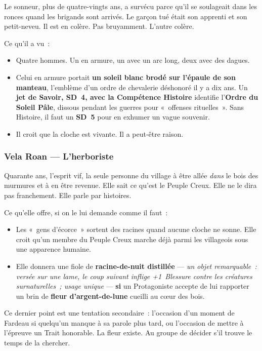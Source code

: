\documentclass[10pt,a4paper]{article}
\newcommand{\tightlist}{\setlength{\itemsep}{0pt}\setlength{\parskip}{0pt}}
\begin{document}
Le sonneur, plus de quatre-vingts ans, a survécu parce qu’il se soulageait dans les ronces quand les brigands sont arrivés. Le garçon tué était son apprenti et son petit-neveu. Il est en colère. Pas bruyamment. L’autre colère.

Ce qu’il a vu~:

\begin{itemize}
\tightlist
\item
  Quatre hommes. Un en armure, un avec un arc long, deux avec des dagues.
\item
  Celui en armure portait \textbf{un soleil blanc brodé sur l’épaule de son manteau}, l’emblème d’un ordre de chevalerie déshonoré il y a dix ans. Un \textbf{jet de Savoir, SD~4, avec la Compétence Histoire} identifie l’\textbf{Ordre du Soleil Pâle}, dissous pendant les guerres pour «~offenses rituelles~». Sans Histoire, il faut un \textbf{SD~5} pour en exhumer un vague souvenir.
\item
  Il croit que la cloche est vivante. Il a peut-être raison.
\end{itemize}

\subsubsection{Vela Roan --- L’herboriste}\label{vela-roan-lherboriste}

Quarante ans, l’esprit vif, la seule personne du village à être allée \emph{dans} le bois des murmures et à en être revenue. Elle sait ce qu’est le Peuple Creux. Elle ne le dira pas franchement. Elle parle par histoires.

Ce qu’elle offre, si on le lui demande comme il faut~:

\begin{itemize}
\tightlist
\item
  Les «~gens d’écorce~» sortent des racines quand aucune cloche ne sonne. Elle croit qu’un membre du Peuple Creux marche déjà parmi les villageois sous une apparence humaine.
\item
  Elle donnera une fiole de \textbf{racine-de-nuit distillée} --- \emph{un objet remarquable~: versée sur une lame, le coup suivant inflige +1~Blessure contre les créatures surnaturelles~; usage unique} --- \textbf{si} un Protagoniste accepte de lui rapporter un brin de \textbf{fleur d’argent-de-lune} cueilli au cœur des bois.
\end{itemize}

Ce dernier point est une tentation secondaire~: l’occasion d’un moment de Fardeau si quelqu’un manque à sa parole plus tard, ou l’occasion de mettre à l’épreuve un Trait honorable. La fleur existe. Au groupe de décider s’il trouve le temps de la chercher.
\end{document}
